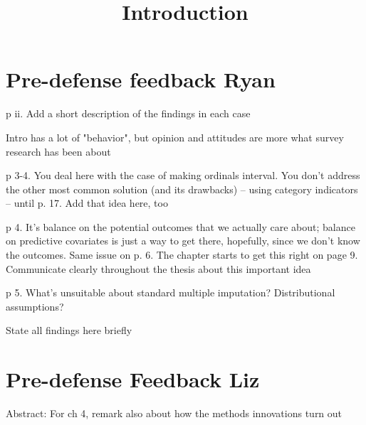 \documentclass[12pt]{article}
\title{Introduction}
\date{}
\begin{document}
\maketitle

\section*{Pre-defense feedback Ryan}
	\begin{coi}
		\item p ii. Add a short description of the findings in each case
		\item Intro has a lot of "behavior", but opinion and attitudes are more what survey research has been about
		\item p 3-4. You deal here with the case of making ordinals interval. You don't address the other most common solution (and its drawbacks) -- using category indicators -- until p. 17. Add that idea here, too
		\item p 4. It's balance on the potential outcomes that we actually care about; balance on predictive covariates is just a way to get there, hopefully, since we don't know the outcomes. Same issue on p. 6. The chapter starts to get this right on page 9. Communicate clearly throughout the thesis about this important idea
		\item p 5. What's unsuitable about standard multiple imputation? Distributional assumptions?
		\item State all findings here briefly
	\end{coi}

\section*{Pre-defense Feedback Liz}
	\begin{coi}
		\item Abstract: For ch 4, remark also about how the methods innovations turn out
	\end{coi}
\end{document}
